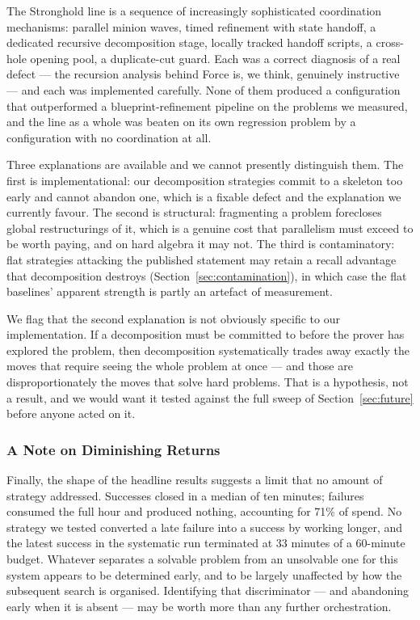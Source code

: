\documentclass[12pt, a4paper]{article}
\begin{document}
The Stronghold line is a sequence of increasingly sophisticated coordination
mechanisms: parallel minion waves, timed refinement with state handoff, a
dedicated recursive decomposition stage, locally tracked handoff scripts, a
cross-hole opening pool, a duplicate-cut guard. Each was a correct diagnosis
of a real defect --- the recursion analysis behind Force is, we think,
genuinely instructive --- and each was implemented carefully. None of them
produced a configuration that outperformed a blueprint-refinement pipeline
on the problems we measured, and the line as a whole was beaten on its own
regression problem by a configuration with no coordination at all.

Three explanations are available and we cannot presently distinguish them.
The first is implementational: our decomposition strategies commit to a
skeleton too early and cannot abandon one, which is a fixable defect and the
explanation we currently favour. The second is structural: fragmenting a
problem forecloses global restructurings of it, which is a genuine cost that
parallelism must exceed to be worth paying, and on hard algebra it may not.
The third is contaminatory: flat strategies attacking the published
statement may retain a recall advantage that decomposition destroys
(Section~\ref{sec:contamination}), in which case the flat baselines' apparent
strength is partly an artefact of measurement.

We flag that the second explanation is not obviously specific to our
implementation. If a decomposition must be committed to before the prover
has explored the problem, then decomposition systematically trades away
exactly the moves that require seeing the whole problem at once --- and those
are disproportionately the moves that solve hard problems. That is a
hypothesis, not a result, and we would want it tested against the full sweep
of Section~\ref{sec:future} before anyone acted on it.

\subsubsection{A Note on Diminishing Returns}

Finally, the shape of the headline results suggests a limit that no amount
of strategy addressed. Successes closed in a median of ten minutes; failures
consumed the full hour and produced nothing, accounting for 71\% of spend.
No strategy we tested converted a late failure into a success by working
longer, and the latest success in the systematic run terminated at 33
minutes of a 60-minute budget. Whatever separates a solvable problem from an
unsolvable one for this system appears to be determined early, and to be
largely unaffected by how the subsequent search is organised. Identifying
that discriminator --- and abandoning early when it is absent --- may be worth
more than any further orchestration.
\end{document}
